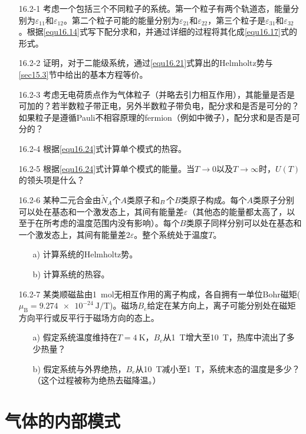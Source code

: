 \begin{itemize}
\item[16.2-1] 考虑一个包括三个不同粒子的系统。第一个粒子有两个轨道态，能量分别为$\varepsilon_{11}$和$\varepsilon_{12}$。第二个粒子可能的能量分别为$\varepsilon_{21}$和$\varepsilon_{22}$，第三个粒子是$\varepsilon_{31}$和$\varepsilon_{32}$。根据\eqref{equ16.14}式写下配分求和，并通过详细的过程将其化成\eqref{equ16.17}式的形式。
\item[16.2-2] 证明，对于二能级系统，通过\eqref{equ16.21}式算出的Helmholtz势与\ref{sec15.3}节中给出的基本方程等价。 
\item[16.2-3] 考虑无电荷质点作为气体粒子（并略去引力相互作用），其能量是否是可加的？若半数粒子带正电，另外半数粒子带负电，配分求和是否是可分的？如果粒子是遵循Pauli不相容原理的fermion（例如中微子），配分求和是否是可分的？
\item[16.2-4] 根据\eqref{equ16.24}式计算单个模式的热容。
\item[16.2-5] 根据\eqref{equ16.24}式计算单个模式的能量。当$T\rightarrow 0$以及$T\rightarrow \infty$时，$U(T)$的领头项是什么？
\item[16.2-6] 某种二元合金由$\tilde N_A$个$A$类原子和$\title N_B$个$B$类原子构成。每个$A$类原子分别可以处在基态和一个激发态上，其间有能量差$\varepsilon$（其他态的能量都太高了，以至于在所考虑的温度范围内没有影响）。每个$B$类原子同样分别可以处在基态和一个激发态上，其间有能量差$2\varepsilon$。整个系统处于温度$T$。
	\begin{itemize}
	\item[a)] 计算系统的Helmholtz势。
	\item[b)] 计算系统的热容。
	\end{itemize}
\item[16.2-7] 某类顺磁盐由\SI{1}{\mole}无相互作用的离子构成，各自拥有一单位Bohr磁矩($\mu_\text{B}=\SI{9.274e-24}{\joule\per\tesla}$)。磁场$B_e$给定在某方向上，离子可能分别处在磁矩方向平行或反平行于磁场方向的态上。
	\begin{itemize}
	\item[a)] 假定系统温度维持在$T=\SI{4}{\kelvin}$，$B_e$从\SI{1}{\tesla}增大至\SI{10}{\tesla}，热库中流出了多少热量？
	\item[b)] 假定系统与外界绝热，$B_e$从\SI{10}{\tesla}减小至\SI{1}{\tesla}，系统末态的温度是多少？（这个过程被称为绝热去磁降温。）
	\end{itemize}
\end{itemize}

\section{气体的内部模式}\label{sec16.3}

